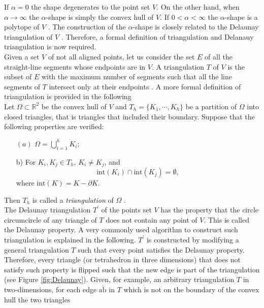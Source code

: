 If $\alpha = 0$ the shape degenerates to the point set $V$. On the other hand, when $\alpha\rightarrow\infty$ the $\alpha$-shape is simply the convex hull of $V$. If $0<\alpha<\infty$ the $\alpha$-shape is a polytope of $V$ \cite{edelsbrunner1994three}. The construction of the $\alpha$-shape is closely related to the Delaunay triangulation of $V$ \cite{mucke1993shapes}. Therefore, a formal definition of triangulation and Delanauy triangulation is now required. \\ \indent
Given a set $V$ of not all aligned points, let us consider the set $E$ of all the straight-line segments whose endpoints are in $V$. 
A triangulation $T$ of $V$ is the subset of $E$ with the maximum number of segments such that all the line segments of $T$ intersect only at their endpoints \cite{lloyd1977triangulations}. 
A more formal definition of triangulation is provided in the following \\ \indent Let $\Omega\subset \mathbb{R}^2$ be the convex hull of $V$ and $T_h = \{K_1, \cdots, K_h\}$ be a partition of $\Omega$ into closed triangles, that is triangles that included their boundary. Suppose that the following properties are verified:
\begin{itemize}
\item[$(a)$] $\Omega = \bigcup_{i = 1}^{h}K_i$;
\item[b)] For $K_i, K_j \in T_h$, $K_i \neq K_j$, and 
\begin{equation*}
\textrm{int}(K_i)\cap \textrm{int}(K_j) = \emptyset,
\end{equation*}
where $\textrm{int}(K) = K-\partial K$.
\end{itemize}
Then $T_h$ is called a \textit{triangulation} of $\Omega$ \cite{Numericalmethods}. \\ \indent
The Delaunay triangulation $T^{\prime}$ of the points set $V$ has the property that the circle circumcircle of any triangle of $T$ does not contain any point of $V$. This is called the Delaunay property. A very commonly used algorithm to construct such triangulation is explained in the following. 
$T^\prime$ is constructed by modifying a general triangulation $T$ such that every point satisfies the Delaunay property. 
Therefore, every triangle (or tetrahedron in three dimensions) that does not satisfy such property is flipped such that the new edge is part of the triangulation (see Figure \ref{fig:Delaunay}). 
Given, for example, an arbitrary triangulation $T$ in two-dimensions, for each edge $\overline{\textrm{ab}}$ in $T$ which is not on the boundary of the convex hull the two triangles 
